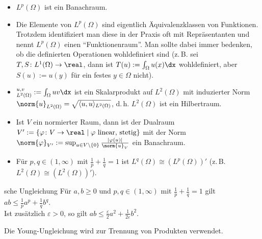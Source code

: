 \begin{Bem}
    \begin{itemize}
        \item
        $L^p(\Omega)$ ist ein Banachraum.
        
        \item
        Die Elemente von $L^p(\Omega)$ sind eigentlich Äquivalenzklassen von Funktionen.
        Trotzdem identifiziert man diese in der Praxis oft mit Repräsentanten und nennt
        $L^p(\Omega)$ einen "`Funktionenraum"'.
        Man sollte dabei immer bedenken, ob die definierten Operationen wohldefiniert sind
        (z.\,B. sei $T, S\colon L^1(\Omega) \to \real$,
        dann ist $T(u) := \int_\Omega u(x) \dx$ wohldefiniert,
        aber $S(u) := u(y)$ für ein festes $y \in \Omega$ nicht).
        
        \item
        $\sp{u, v}_{L^2(\Omega)} := \int_\Omega uv \dx$ ist ein Skalarprodukt auf
        $L^2(\Omega)$ mit induzierter Norm\\
        $\norm{u}_{L^2(\Omega)} = \sqrt{\langle u, u \rangle_{L^2(\Omega)}}$,
        d.\,h. $L^2(\Omega)$ ist ein Hilbertraum.
        
        \item
        Ist $V$ ein normierter Raum, dann ist der Dualraum
        $V' := \{\varphi\colon V \to \real \;|\; \text{$\varphi$ linear, stetig}\}$
        mit der Norm
        $\norm{\varphi}_{V'} := \sup_{u \in V \setminus \{0\}} \frac{|\varphi(u)|}{\norm{u}_V}$
        ein Banachraum.
        
        \item
        Für $p, q \in (1, \infty)$ mit $\frac{1}{p} + \frac{1}{q} = 1$ ist
        $L^q(\Omega) \cong (L^p(\Omega))'$
        (z.\,B. $L^2(\Omega) \cong (L^2(\Omega))'$).
    \end{itemize}
\end{Bem}

\linie

\begin{Satz}{sche Ungleichung}
    Für $a, b \ge 0$ und $p, q \in (1, \infty)$ mit $\frac{1}{p} + \frac{1}{q} = 1$ gilt
    $ab \le \frac{1}{p} a^p + \frac{1}{q} b^q$.\\
    Ist zusätzlich $\varepsilon > 0$, so gilt
    $ab \le \frac{\varepsilon}{2} a^2 + \frac{1}{2\varepsilon} b^2$.
\end{Satz}

\begin{Bem}
    Die Young-Ungleichung wird zur Trennung von Produkten verwendet.
\end{Bem}

